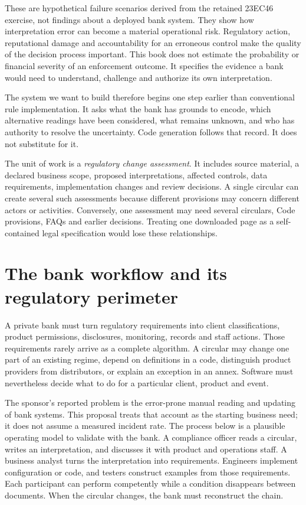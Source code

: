 \documentclass[12pt,a4paper,oneside,openany]{book}
\begin{document}
These are hypothetical failure scenarios derived from the retained 23EC46
exercise, not findings about a deployed bank system. They show how interpretation error can become a material operational risk. Regulatory action,
reputational damage and accountability for an erroneous control make the quality
of the decision process important. This book does not estimate the probability
or financial severity of an enforcement outcome. It specifies the evidence a
bank would need to understand, challenge and authorize its own interpretation.

The system we want to build therefore begins one step earlier than conventional
rule implementation. It asks what the bank has grounds to encode, which
alternative readings have been considered, what remains unknown, and who has
authority to resolve the uncertainty. Code generation follows that record. It
does not substitute for it.

The unit of work is a \emph{regulatory change assessment}. It includes source
material, a declared business scope, proposed interpretations, affected controls,
data requirements, implementation changes and review decisions. A single
circular can create several such assessments because different provisions may
concern different actors or activities. Conversely, one assessment may need
several circulars, Code provisions, FAQs and earlier decisions. Treating one
downloaded page as a self-contained legal specification would lose these
relationships.

\section{The bank workflow and its regulatory perimeter}
\label{merge:P-01-problem:00}

\label{sec:problem}

A private bank must turn regulatory requirements into client classifications,
product permissions, disclosures, monitoring, records and staff actions. Those
requirements rarely arrive as a complete algorithm. A circular may change one
part of an existing regime, depend on definitions in a code, distinguish product
providers from distributors, or explain an exception in an annex. Software must
nevertheless decide what to do for a particular client, product and event.

The sponsor's reported problem is the error-prone manual reading and updating of
bank systems. This proposal treats that account as the starting business need;
it does not assume a measured incident rate. The process below is a plausible
operating model to validate with the bank. A compliance officer reads a circular,
writes an interpretation, and discusses it with product and operations staff. A
business analyst turns the interpretation into requirements. Engineers implement
configuration or code, and testers construct examples from those requirements.
Each participant can perform competently while a condition disappears between
documents. When the circular changes, the bank must reconstruct the chain.
\end{document}
